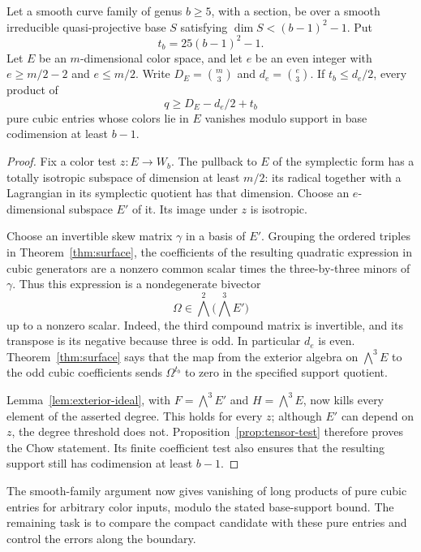 \begin{lemma}
\label{lem:large-vertex-test}
Let a smooth curve family of genus \(b\ge5\), with a section, be over a
smooth irreducible quasi-projective base \(S\) satisfying
\(\dim S<(b-1)^2-1\).  Put
\[
 t_b=25(b-1)^2-1.
\]
Let \(E\) be an \(m\)-dimensional color space, and let \(e\) be an even
integer with \(e\ge m/2-2\) and \(e\le m/2\).
Write \(D_E=\binom m3\) and \(d_e=\binom e3\).
If \(t_b\le d_e/2\), every product of
\[
 q\ge D_E-d_e/2+t_b
\]
pure cubic entries whose colors lie in \(E\) vanishes modulo support in
base codimension at least \(b-1\).
\end{lemma}

\begin{proof}
Fix a color test \(z:E\to W_b\).  The pullback to \(E\) of the symplectic
form has a totally isotropic subspace of dimension at least \(m/2\):
its radical together with a Lagrangian in its symplectic quotient has
that dimension.  Choose an \(e\)-dimensional subspace \(E'\) of it.
Its image under \(z\) is isotropic.

Choose an invertible skew matrix \(\gamma\) in a basis of \(E'\).
Grouping the ordered triples in Theorem~\ref{thm:surface}, the coefficients
of the resulting quadratic expression in cubic generators are a
nonzero common scalar times the three-by-three minors of \(\gamma\).
Thus this expression is a nondegenerate bivector
\[
 \Omega\in\bigwedge^2\bigl(\bigwedge^3E'\bigr)
\]
up to a nonzero scalar.  Indeed, the third compound matrix is invertible,
and its transpose is its negative because three is odd.
In particular \(d_e\) is even.  Theorem~\ref{thm:surface} says that the
map from the exterior algebra on \(\bigwedge^3 E\) to the odd cubic
coefficients sends \(\Omega^{t_b}\) to zero in the specified support
quotient.

Lemma~\ref{lem:exterior-ideal}, with
\(F=\bigwedge^3E'\) and \(H=\bigwedge^3E\), now kills every element of
the asserted degree.  This holds for every \(z\); although \(E'\) can
depend on \(z\), the degree threshold does not.
Proposition~\ref{prop:tensor-test} therefore proves the Chow statement.
Its finite coefficient test also ensures that the resulting support
still has codimension at least \(b-1\).
\end{proof}


The smooth-family argument now gives vanishing of long products of
pure cubic entries for arbitrary color inputs, modulo the stated
base-support bound. The remaining task is
to compare the compact candidate with these pure entries and control
the errors along the boundary.
